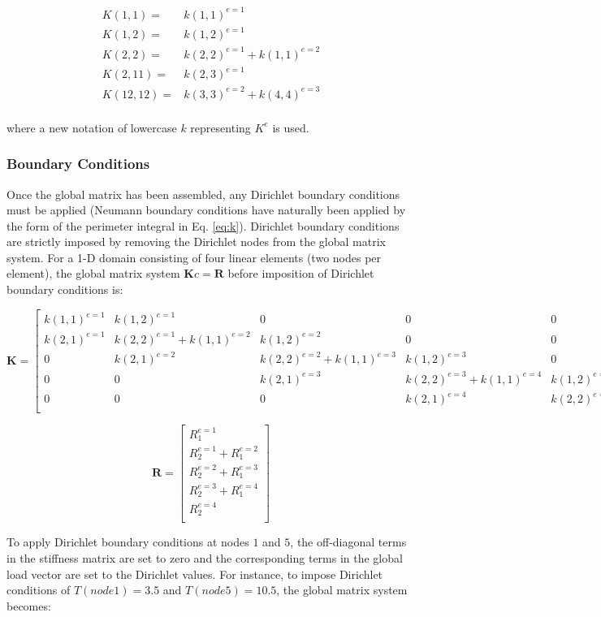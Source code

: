 \documentclass[10pt]{article}
\newcommand{\beq}{\begin{equation}}
\newcommand{\eeq}{\end{equation}}
\newcommand{\beqa}{\begin{equation}\begin{aligned}}
\newcommand{\eeqa}{\end{aligned}\end{equation}}
\begin{document}
\beqa
K(1, 1) =& k(1, 1)^{e=1}\\
K(1, 2) =& k(1, 2)^{e=1}\\
K(2, 2) =& k(2, 2)^{e=1}+k(1, 1)^{e=2}\\
K(2, 11) =& k(2, 3)^{e=1}\\
K(12, 12) =& k(3, 3)^{e=2}+k(4, 4)^{e=3}\\
\eeqa

where a new notation of lowercase \(k\) representing \(K^e\) is used.

\subsubsection{Boundary Conditions}
Once the global matrix has been assembled, any Dirichlet boundary conditions must be applied (Neumann boundary conditions have naturally been applied by the form of the perimeter integral in Eq. \eqref{eq:k}). Dirichlet boundary conditions are strictly imposed by removing the Dirichlet nodes from the global matrix system. For a 1-D domain consisting of four linear elements (two nodes per element), the global matrix system \(\textbf{K}c=\textbf{R}\) before imposition of Dirichlet boundary conditions is:

\beq
\textbf{K}=
\begin{bmatrix}
k(1, 1)^{e=1} & k(1, 2)^{e=1} & 0 & 0 & 0\\
k(2, 1)^{e=1} & k(2, 2)^{e=1}+k(1, 1)^{e=2} & k(1, 2)^{e=2} & 0 & 0\\
0 & k(2, 1)^{e=2} & k(2, 2)^{e=2}+k(1, 1)^{e=3} & k(1, 2)^{e=3} & 0\\
0 & 0 & k(2, 1)^{e=3} & k(2, 2)^{e=3}+k(1, 1)^{e=4} & k(1, 2)^{e=4}\\
0 & 0 & 0 & k(2, 1)^{e=4} & k(2, 2)^{e=4}\\
\end{bmatrix}
\eeq

\beq
\textbf{R}=\begin{bmatrix}
R_1^{e=1} \\ R_2^{e=1}+R_1^{e=2}\\R_2^{e=2}+R_1^{e=3}\\R_2^{e=3}+R_1^{e=4}\\R_2^{e=4}\\
\end{bmatrix}
\eeq

To apply Dirichlet boundary conditions at nodes \(1\) and \(5\), the off-diagonal terms in the stiffness matrix are set to zero and the corresponding terms in the global load vector are set to the Dirichlet values. For instance, to impose Dirichlet conditions of \(T(node 1)=3.5\) and \(T(node 5) = 10.5\), the global matrix system becomes:
\end{document}
